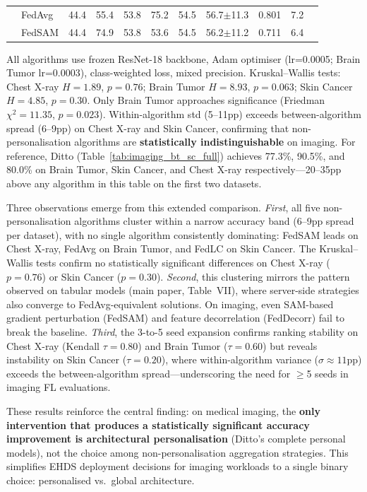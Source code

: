 \documentclass[conference,a4paper]{IEEEtran}
\begin{document}
\begin{table}[htbp]
\begin{tabular}{llccccccccc}
 & FedAvg & 44.4 & 55.4 & 53.8 & 75.2 & 54.5 & 56.7$\pm$11.3 & 0.801 & 7.2 \\
 & FedSAM & 44.4 & 74.9 & 53.8 & 53.6 & 54.5 & 56.2$\pm$11.2 & 0.711 & 6.4 \\
\bottomrule
\end{tabular}
\par{\footnotesize All algorithms use frozen ResNet-18 backbone, Adam optimiser (lr=0.0005; Brain Tumor lr=0.0003), class-weighted loss, mixed precision. Kruskal--Wallis tests: Chest X-ray $H{=}1.89$, $p{=}0.76$; Brain Tumor $H{=}8.93$, $p{=}0.063$; Skin Cancer $H{=}4.85$, $p{=}0.30$. Only Brain Tumor approaches significance (Friedman $\chi^2{=}11.35$, $p{=}0.023$). Within-algorithm std (5--11pp) exceeds between-algorithm spread (6--9pp) on Chest X-ray and Skin Cancer, confirming that non-personalisation algorithms are \textbf{statistically indistinguishable} on imaging. For reference, Ditto (Table~\ref{tab:imaging_bt_sc_full}) achieves 77.3\%, 90.5\%, and 80.0\% on Brain Tumor, Skin Cancer, and Chest X-ray respectively---20--35pp above any algorithm in this table on the first two datasets.}
\end{table}

Three observations emerge from this extended comparison. \textit{First}, all five non-personalisation algorithms cluster within a narrow accuracy band (6--9pp spread per dataset), with no single algorithm consistently dominating: FedSAM leads on Chest X-ray, FedAvg on Brain Tumor, and FedLC on Skin Cancer. The Kruskal--Wallis tests confirm no statistically significant differences on Chest X-ray ($p{=}0.76$) or Skin Cancer ($p{=}0.30$). \textit{Second}, this clustering mirrors the pattern observed on tabular models (main paper, Table~VII), where server-side strategies also converge to FedAvg-equivalent solutions. On imaging, even SAM-based gradient perturbation (FedSAM) and feature decorrelation (FedDecorr) fail to break the baseline. \textit{Third}, the 3-to-5 seed expansion confirms ranking stability on Chest X-ray (Kendall $\tau{=}0.80$) and Brain Tumor ($\tau{=}0.60$) but reveals instability on Skin Cancer ($\tau{=}0.20$), where within-algorithm variance ($\sigma{\approx}11$pp) exceeds the between-algorithm spread---underscoring the need for $\geq$5 seeds in imaging FL evaluations.

These results reinforce the central finding: on medical imaging, the \textbf{only intervention that produces a statistically significant accuracy improvement is architectural personalisation} (Ditto's complete personal models), not the choice among non-personalisation aggregation strategies. This simplifies EHDS deployment decisions for imaging workloads to a single binary choice: personalised vs.\ global architecture.
\end{document}
